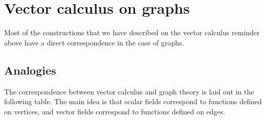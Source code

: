\section{Vector calculus on graphs}


Most of the constructions that we have described on the vector calculus
reminder above have a direct correspondence in the case of graphs.


\subsection{Analogies}


The correspondence between vector calculus and graph theory is laid out in
the following table.
The main idea is that scalar fields correspond to
functions defined on vertices, and vector fields correspond to functions
defined on edges.

